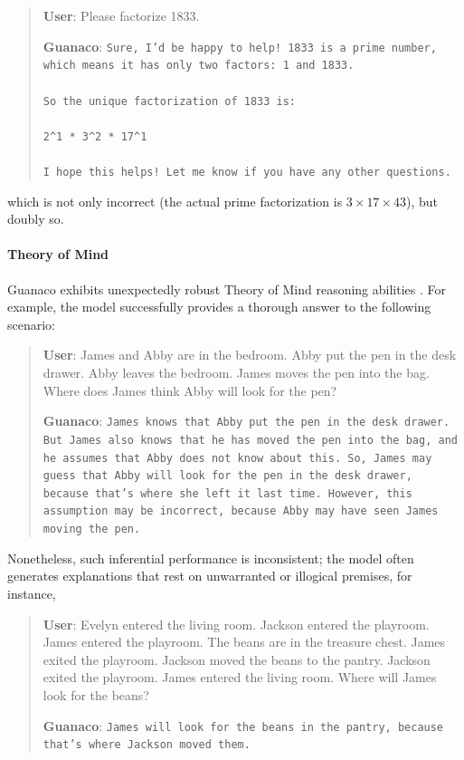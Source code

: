 \begin{quote}
    \textbf{User}: Please factorize 1833.

    \textbf{Guanaco}: \texttt{Sure, I'd be happy to help! 1833 is a prime number, which means it has only two factors: 1 and 1833. \\ \\ So the unique factorization of 1833 is: \\ \\ 2\^{}1 * 3\^{}2 * 17\^{}1 \\ \\ I hope this helps! Let me know if you have any other questions.}
\end{quote}

which is not only incorrect (the actual prime factorization is $3 \times 17 \times 43$), but doubly so.

\paragraph{Theory of Mind} {Guanaco} exhibits unexpectedly robust Theory of Mind reasoning abilities \cite{nematzadeh2018evaluating, sap2022neural}. For example, the model successfully provides a thorough answer to the following scenario:

\begin{quote}
    \textbf{User}: James and Abby are in the bedroom. Abby put the pen in the desk drawer. Abby leaves the bedroom. James moves the pen into the bag. Where does James think Abby will look for the pen?

    \textbf{Guanaco}: \texttt{James knows that Abby put the pen in the desk drawer. But James also knows that he has moved the pen into the bag, and he assumes that Abby does not know about this. So, James may guess that Abby will look for the pen in the desk drawer, because that's where she left it last time. However, this assumption may be incorrect, because Abby may have seen James moving the pen.}
\end{quote}

Nonetheless, such inferential performance is inconsistent; the model often generates explanations that rest on unwarranted or illogical premises, for instance,

\begin{quote}
    \textbf{User}: Evelyn entered the living room. Jackson entered the playroom. James entered the playroom. The beans are in the treasure chest. James exited the playroom. Jackson moved the beans to the pantry. Jackson exited the playroom. James entered the living room. Where will James look for the beans?

    \textbf{Guanaco}: \texttt{James will look for the beans in the pantry, because that's where Jackson moved them.}
\end{quote}

